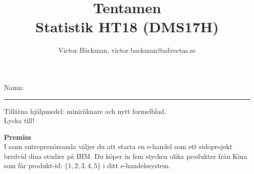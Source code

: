 \documentclass[a4paper,10pt]{article}
\title{Tentamen\\ {Statistik HT18 (DMS17H)}}
\author{Victor Bäckman, victor.backman@advectas.se}
\begin{document}
\maketitle
\vspace{2cm}
Namn:
{\rule{13cm}{0.4pt}}
\vspace{5cm}
\begin{center}
  Tillåtna hjälpmedel: miniräknare och nytt formelblad.\\
    \vspace{3cm}
  {\huge Lycka till!}
\end{center}

\newpage
{\bf Premiss} \\
I sann entreprenörsanda väljer du att starta en e-handel som ett sidoprojekt bredvid dina studier på IHM. Du köper in fem stycken olika produkter från Kina som får produkt-id: $\{1, 2, 3, 4, 5\}$ i ditt e-handelssystem.
\vspace{2cm}
\end{document}
